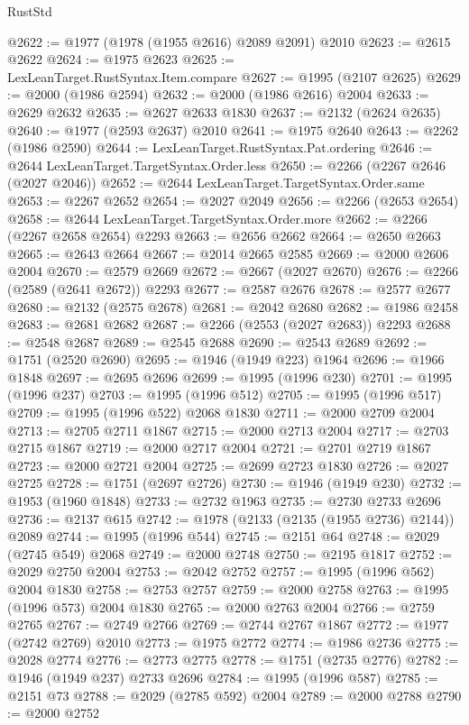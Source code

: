 \begin{lexlean}{RustStd}
\begin{coremodule}
{\begin{coremodule}
{{{{{{{{{{{{{{{{{{{{{{{{{{{{{{{@2622 := @1977 (@1978 (@1955 @2616) @2089 @2091) @2010
@2623 := @2615 @2622
@2624 := @1975 @2623
@2625 := LexLeanTarget.RustSyntax.Item.compare
@2627 := @1995 (@2107 @2625)
@2629 := @2000 (@1986 @2594)
@2632 := @2000 (@1986 @2616) @2004
@2633 := @2629 @2632
@2635 := @2627 @2633 @1830
@2637 := @2132 (@2624 @2635)
@2640 := @1977 (@2593 @2637) @2010
@2641 := @1975 @2640
@2643 := @2262 (@1986 @2590)
@2644 := LexLeanTarget.RustSyntax.Pat.ordering
@2646 := @2644 LexLeanTarget.TargetSyntax.Order.less
@2650 := @2266 (@2267 @2646 (@2027 @2046))
@2652 := @2644 LexLeanTarget.TargetSyntax.Order.same
@2653 := @2267 @2652
@2654 := @2027 @2049
@2656 := @2266 (@2653 @2654)
@2658 := @2644 LexLeanTarget.TargetSyntax.Order.more
@2662 := @2266 (@2267 @2658 @2654) @2293
@2663 := @2656 @2662
@2664 := @2650 @2663
@2665 := @2643 @2664
@2667 := @2014 @2665 @2585
@2669 := @2000 @2606 @2004
@2670 := @2579 @2669
@2672 := @2667 (@2027 @2670)
@2676 := @2266 (@2589 (@2641 @2672)) @2293
@2677 := @2587 @2676
@2678 := @2577 @2677
@2680 := @2132 (@2575 @2678)
@2681 := @2042 @2680
@2682 := @1986 @2458
@2683 := @2681 @2682
@2687 := @2266 (@2553 (@2027 @2683)) @2293
@2688 := @2548 @2687
@2689 := @2545 @2688
@2690 := @2543 @2689
@2692 := @1751 (@2520 @2690)
@2695 := @1946 (@1949 @223) @1964
@2696 := @1966 @1848
@2697 := @2695 @2696
@2699 := @1995 (@1996 @230)
@2701 := @1995 (@1996 @237)
@2703 := @1995 (@1996 @512)
@2705 := @1995 (@1996 @517)
@2709 := @1995 (@1996 @522) @2068 @1830
@2711 := @2000 @2709 @2004
@2713 := @2705 @2711 @1867
@2715 := @2000 @2713 @2004
@2717 := @2703 @2715 @1867
@2719 := @2000 @2717 @2004
@2721 := @2701 @2719 @1867
@2723 := @2000 @2721 @2004
@2725 := @2699 @2723 @1830
@2726 := @2027 @2725
@2728 := @1751 (@2697 @2726)
@2730 := @1946 (@1949 @230)
@2732 := @1953 (@1960 @1848)
@2733 := @2732 @1963
@2735 := @2730 @2733 @2696
@2736 := @2137 @615
@2742 := @1978 (@2133 (@2135 (@1955 @2736) @2144)) @2089
@2744 := @1995 (@1996 @544)
@2745 := @2151 @64
@2748 := @2029 (@2745 @549) @2068
@2749 := @2000 @2748
@2750 := @2195 @1817
@2752 := @2029 @2750 @2004
@2753 := @2042 @2752
@2757 := @1995 (@1996 @562) @2004 @1830
@2758 := @2753 @2757
@2759 := @2000 @2758
@2763 := @1995 (@1996 @573) @2004 @1830
@2765 := @2000 @2763 @2004
@2766 := @2759 @2765
@2767 := @2749 @2766
@2769 := @2744 @2767 @1867
@2772 := @1977 (@2742 @2769) @2010
@2773 := @1975 @2772
@2774 := @1986 @2736
@2775 := @2028 @2774
@2776 := @2773 @2775
@2778 := @1751 (@2735 @2776)
@2782 := @1946 (@1949 @237) @2733 @2696
@2784 := @1995 (@1996 @587)
@2785 := @2151 @73
@2788 := @2029 (@2785 @592) @2004
@2789 := @2000 @2788
@2790 := @2000 @2752
}}}}}}}}}}}}}}}}}}}}}}}}}}}}}}}
\end{coremodule}}
\end{coremodule}
\end{lexlean}
